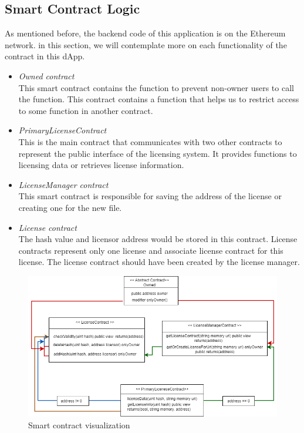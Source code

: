 \subsection{Smart Contract Logic}
As mentioned before, the backend code of this application is on the Ethereum network. in this section, we will contemplate more on each functionality of the contract in this dApp.
\begin{itemize}
	\item \textit{Owned contract} \\
	This smart contract contains the function to prevent non-owner users to call the function. This contract contains a function that helps us to restrict access to some function in another contract. \\
	\item \textit{PrimaryLicenseContract} \\
	This is the main contract that communicates with two other contracts to represent the public interface of the licensing system. It provides functions to licensing data or retrieves license information. \\
   \item \textit{LicenseManager contract} \\
	This smart contract is responsible for saving the address of the license or creating one for the new file. \\
	\item \textit{License contract} \\
	The hash value and licensor address would be stored in this contract. License contracts represent only one license and associate license contract for this license. The license contract should have been created by the license manager.

\end{itemize}

\begin{center}
	
	\begin{figure}[htb!]
		
		\begin{minipage}{0.75\linewidth}
			
			\includegraphics[width=1.45\textwidth]{images/chap03_smartContract_visual.png}
		\end{minipage}
		\caption{Smart contract visualization}
		
	\end{figure}
	
\end{center}

